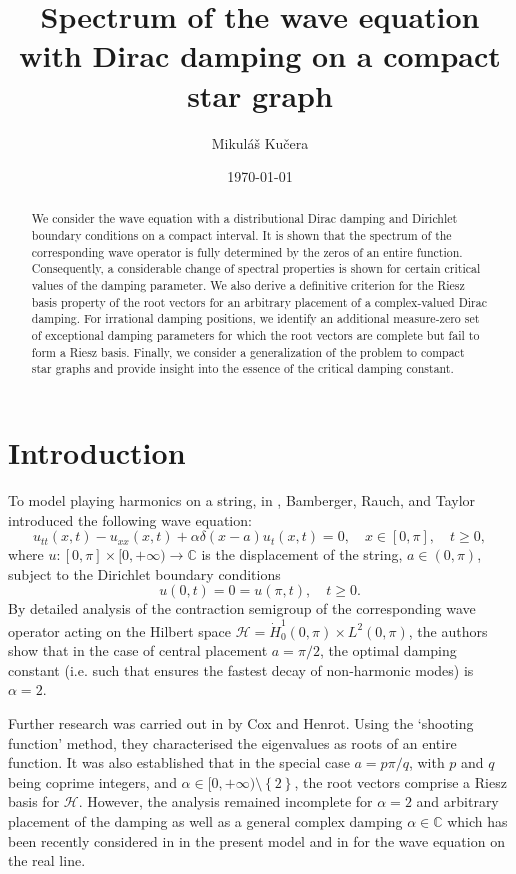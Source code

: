 \documentclass[11pt, a4paper,reqno]{amsart}
\title[The wave equation with Dirac damping on a compact star graph]{Spectrum of the wave equation with Dirac damping on a compact star graph}
\author{Mikul\'{a}\v{s} Ku\v{c}era}
\date{\today}
\theoremstyle{plain}
\theoremstyle{definition}
\theoremstyle{remark}
\newcommand{\1}{\mathds 1}
\begin{document}
%
\begin{abstract}
We consider the wave equation with a distributional Dirac damping and Dirichlet boundary conditions on a compact interval. It is shown that the spectrum of the corresponding wave operator is fully determined by the zeros of an entire function. Consequently, a considerable change of spectral properties is shown for certain critical values of the damping parameter. We also derive a definitive criterion for the Riesz basis property of the root vectors for an arbitrary placement of a complex-valued Dirac damping. For irrational damping positions, we identify an additional measure-zero set of exceptional damping parameters for which the root vectors are complete but fail to form a Riesz basis. Finally, we consider a generalization of the problem to compact star graphs and provide insight into the essence of the critical damping constant.
\end{abstract}
%

\maketitle
 
\section{Introduction}
%
To model playing harmonics on a string, in \cite{BRT}, Bamberger, Rauch, and Taylor introduced the following wave equation:
\begin{equation}
u_{tt}(x,t) - u_{xx}(x,t) + \alpha \delta(x-a)u_t(x,t) = 0, \quad x \in [0, \pi], \quad t \geq 0,
    \label{WaveEquation}
\end{equation}
where $u:\left[0, \pi\right] \times [0, +\infty) \to \mathbb C$ is the displacement of the string, $a \in  (0, \pi)$, subject to the Dirichlet boundary conditions
\[
u(0, t) = 0 = u(\pi, t), \quad t \geq 0.
\]
By detailed analysis of the contraction semigroup of the corresponding wave operator acting on the Hilbert space $\mathcal H = \dot H_0^1(0, \pi) \times L^2(0, \pi)$, the authors show that in the case of central placement $a = \pi/2$, the optimal damping constant (i.e. such that ensures the fastest decay of non-harmonic modes) is $\alpha = 2$. 


Further research was carried out in \cite{CH} by Cox and Henrot. Using the `shooting function' method, they characterised the eigenvalues as roots of an entire function. It was also established that in the special case $a = p\pi/q$, with $p$ and $q$ being coprime integers, and $\alpha \in [0, +\infty) \setminus \left\{2\right\}$, the root vectors comprise a Riesz basis for $\mathcal H$. However, the analysis remained incomplete for $\alpha = 2$ and arbitrary placement of the damping as well as a general complex damping $\alpha \in \mathbb C$ which has been recently considered in \cite{KrLip} in the present model and in \cite{KrRoy} for the wave equation on the real line.
\end{document}

